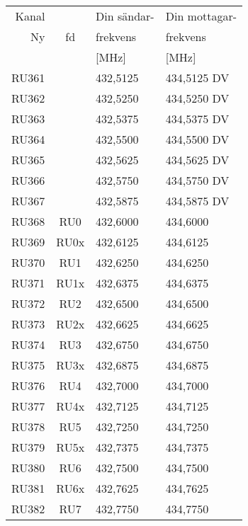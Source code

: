 
\begin{tabular}{ r | c | l | l }
	Kanal &       & Din sändar-        & Din mottagar-  \\
	Ny    & fd    & frekvens       & frekvens \\
          &       & [\si{\mega\hertz}] & [\si{\mega\hertz}] \\
	\hline
	RU361 &       & 432,5125       & 434,5125 DV    \\
	RU362 &       & 432,5250       & 434,5250 DV    \\
	RU363 &       & 432,5375       & 434,5375 DV    \\
	RU364 &       & 432,5500       & 434,5500 DV    \\
	RU365 &       & 432,5625       & 434,5625 DV    \\
	RU366 &       & 432,5750       & 434,5750 DV    \\
	RU367 &       & 432,5875       & 434,5875 DV    \\
	RU368 & RU0   & 432,6000       & 434,6000       \\
	RU369 & RU0x  & 432,6125       & 434,6125       \\
	RU370 & RU1   & 432,6250       & 434,6250       \\
	RU371 & RU1x  & 432,6375       & 434,6375       \\
	RU372 & RU2   & 432,6500       & 434,6500       \\
	RU373 & RU2x  & 432,6625       & 434,6625       \\
	RU374 & RU3   & 432,6750       & 434,6750       \\
	RU375 & RU3x  & 432,6875       & 434,6875       \\
	RU376 & RU4   & 432,7000       & 434,7000       \\
	RU377 & RU4x  & 432,7125       & 434,7125       \\
	RU378 & RU5   & 432,7250       & 434,7250       \\
	RU379 & RU5x  & 432,7375       & 434,7375       \\
	RU380 & RU6   & 432,7500       & 434,7500       \\
	RU381 & RU6x  & 432,7625       & 434,7625       \\
	RU382 & RU7   & 432,7750       & 434,7750       \\

\end{tabular}
